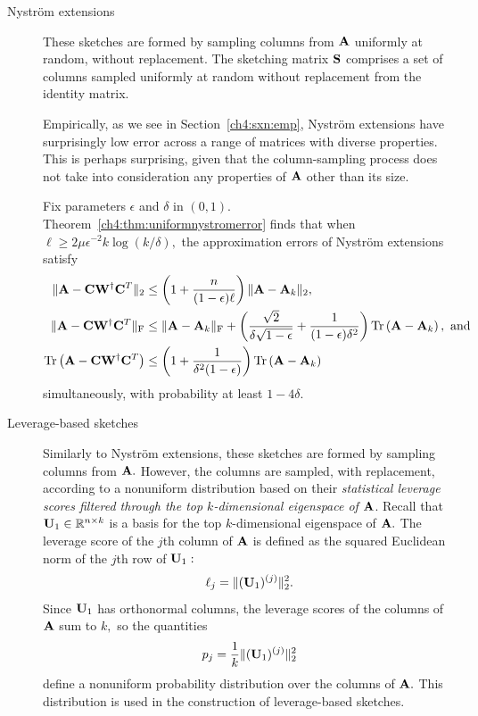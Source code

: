 \begin{description}
\item[Nystr\"om extensions] These sketches are formed by sampling columns from $\mathbf{A}$ 
 uniformly at random, without replacement. The sketching matrix $\mathbf{S}$ comprises a
 set of columns sampled uniformly at random without replacement from the identity matrix.
 
 Empirically, as we see in Section~\ref{ch4:sxn:emp}, Nystr\"om extensions have 
 surprisingly low error across a range of matrices with diverse properties. 
 This is perhaps surprising, given that the column-sampling process does not 
 take into consideration any properties of $\mathbf{A}$ other than its size.

 Fix parameters $\epsilon$ and $\delta$ in $(0,1).$ 
 Theorem~\ref{ch4:thm:uniformnystromerror} finds that when 
 $\ell \geq 2\mu\epsilon^{-2} k \log(k/\delta),$
 the approximation errors of Nystr\"om extensions satisfy
 \begin{align*}
  \|\mathbf{A} - \mathbf{C}\mathbf{W}^\dagger \mathbf{C}^T\|_2 & \leq \left(1 + \frac{n}{(1-\epsilon)\ell}\right) \|\mathbf{A} - \mathbf{A}_k\|_2, \\
  \|\mathbf{A} - \mathbf{C}\mathbf{W}^\dagger \mathbf{C}^T\|_{\mathrm{F}} & \leq \|\mathbf{A} - \mathbf{A}_k\|_{\mathrm{F}} + 
     \left( \frac{\sqrt{2}}{\delta\sqrt{1-\epsilon}} + \frac{1}{(1-\epsilon)\delta^2} \right) \operatorname{Tr}\left(\mathbf{A} - \mathbf{A}_k\right), \text{ and} \\
  \operatorname{Tr}\left(\mathbf{A} - \mathbf{C}\mathbf{W}^\dagger \mathbf{C}^T\right) & \leq \left(1 + \frac{1}{\delta^2 (1-\epsilon)}\right)\operatorname{Tr}\left(\mathbf{A} - \mathbf{A}_k\right)
 \end{align*}
 simultaneously, with probability at least $1-4\delta.$
 
 \item[Leverage-based sketches] Similarly to Nystr\"om extensions, these sketches are
 formed by sampling columns from $\mathbf{A}.$ However, the columns are sampled, with replacement, according to
 a nonuniform distribution based on their \emph{statistical leverage scores filtered through
 the top $k$-dimensional eigenspace of $\mathbf{A}$}. Recall that $\mathbf{U}_1 \in \mathbb{R}^{n \times k}$ is a basis for the
 top $k$-dimensional eigenspace of $\mathbf{A}.$ The leverage score of the $j$th column
 of $\mathbf{A}$ is defined as the squared Euclidean norm of the $j$th row of $\mathbf{U}_1:$
 \[
  \ell_j = \|(\mathbf{U}_1)^{(j)}\|_2^2.
 \]
 Since $\mathbf{U}_1$ has orthonormal columns, the leverage scores of the columns of $\mathbf{A}$
 sum to $k,$ so the quantities
 \[
  p_j = \frac{1}{k}\|(\mathbf{U}_1)^{(j)}\|_2^2
 \]
 define a nonuniform probability distribution over the columns of $\mathbf{A}.$ This distribution is
 used in the construction of leverage-based sketches.
 

\end{description}
